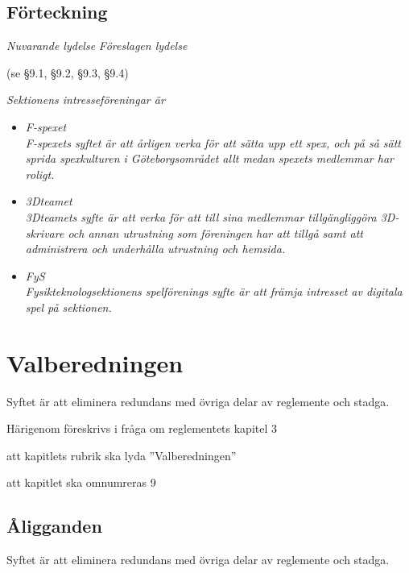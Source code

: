 \documentclass{article}
\newenvironment{lydelse}
    {\begin{paracol}{2}%
        \emph{Nuvarande lydelse}%
        \switchcolumn%
        \emph{Föreslagen lydelse}%
    \end{paracol}%
    \begin{enumerate}[label=\thesubsection.\arabic*]%
    \begin{paracol}{2}%
    }{\end{paracol}\end{enumerate}}
\begin{document}
\subsection{Förteckning}
\begin{lydelse}
    
    \item[] (se \S9.1, \S9.2, \S9.3, \S9.4)
   
    \switchcolumn
    
    \item \emph{Sektionens intresseföreningar är}
    \begin{itemize}
        \item \emph{F-spexet} \\
            {\itshape F-spexets syftet är att årligen verka för att sätta upp ett spex, och på så sätt sprida spexkulturen i Göteborgsområdet allt medan spexets medlemmar har roligt.}
        \item \emph{3Dteamet} \\
            {\itshape 3Dteamets syfte är att verka för att till sina medlemmar tillgängliggöra 3D-skrivare och annan utrustning som föreningen har att tillgå samt att administrera och underhålla utrustning och hemsida.}
        \item \emph{FyS} \\
            {\itshape Fysikteknologsektionens spelförenings syfte är att främja intresset av digitala spel på sektionen.}
    \end{itemize}
    
\end{lydelse}

\section{Valberedningen}
Syftet är att eliminera redundans med övriga delar av reglemente och stadga. 

Härigenom föreskrivs i fråga om reglementets kapitel 3

\begin{dels}
    \item att kapitlets rubrik ska lyda ''Valberedningen''
    \item att kapitlet ska omnumreras 9
\end{dels}

\subsection{Åligganden}
Syftet är att eliminera redundans med övriga delar av reglemente och stadga. 
\end{document}
